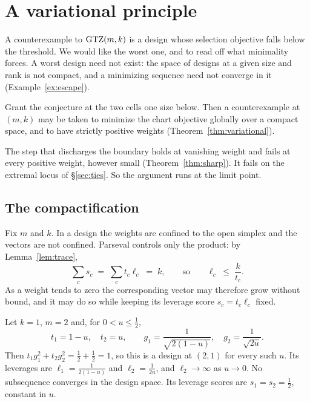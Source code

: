 \section{A variational principle}\label{sec:compactness}

A counterexample to $\mathrm{GTZ}(m,k)$ is a design whose selection objective
falls below the threshold.  We would like the worst one, and to read off
what minimality forces.  A worst design need not exist: the space of
designs at a given size and rank is not compact, and a minimizing
sequence need not converge in it (Example~\ref{ex:escape}).

Grant the conjecture at the two cells one size below.  Then a
counterexample at $(m,k)$ may be taken to minimize the chart objective
globally over a compact space, and to have strictly positive weights
(Theorem~\ref{thm:variational}).

The step that discharges the boundary holds at vanishing weight and
fails at every positive weight, however small (Theorem~\ref{thm:sharp}).
It fails on the extremal locus of \S\ref{sec:ties}.  So the argument runs
at the limit point.

\subsection{The compactification}\label{sec:compactchart}

Fix $m$ and $k$.  In a design the weights are confined to the open
simplex and the vectors are not confined.  Parseval controls only the
product: by Lemma~\ref{lem:trace},
\begin{equation}\label{eq:levbound}
  \sum_c s_c\;=\;\sum_c t_c\ell_c\;=\;k,
  \qquad\text{so}\qquad \ell_c\;\le\;\frac{k}{t_c} .
\end{equation}
As a weight tends to zero the corresponding vector may therefore grow
without bound, and it may do so while keeping its leverage score
$s_c=t_c\ell_c$ fixed.

\begin{example}\label{ex:escape}
Let $k=1$, $m=2$ and, for $0<u\le\tfrac12$,
\[
  t_1=1-u,\quad t_2=u,\qquad
  g_1=\frac1{\sqrt{2(1-u)}},\quad g_2=\frac1{\sqrt{2u}} .
\]
Then $t_1g_1^2+t_2g_2^2=\tfrac12+\tfrac12=1$, so this is a design at
$(2,1)$ for every such $u$.  Its leverages are
$\ell_1=\tfrac1{2(1-u)}$ and $\ell_2=\tfrac1{2u}$, and
$\ell_2\to\infty$ as $u\to0$.
No subsequence converges in the design space.  Its leverage scores are
$s_1=s_2=\tfrac12$, constant in $u$.
\end{example}

